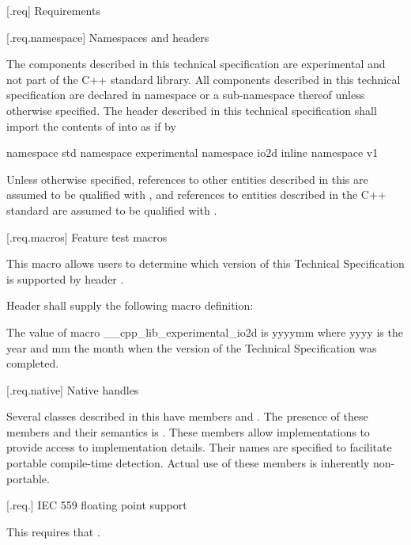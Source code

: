  [\iotwod.req] {Requirements}

 [\iotwod.req.namespace] {Namespaces and headers}

\pnum
The components described in this technical specification are experimental and not part of the C++ standard library. All components described in this technical specification are declared in namespace
 or a sub-namespace thereof unless otherwise specified. The header described in this technical specification shall import the contents of  into  as if by

\pnum
\begin{codeblock}
namespace std {
  namespace experimental {
    namespace io2d {
      inline namespace v1 { }
    }
  }
}
\end{codeblock}

\pnum
Unless otherwise specified, references to other entities described in this \documenttypename are assumed to be qualified with , and references to entities
described in the C++ standard are assumed to be qualified with .

 [\iotwod.req.macros] {Feature test macros}

\pnum
This macro allows users to determine which version of this Technical Specification is supported by header .

\pnum
Header  shall supply the following macro definition:

\pnum
{}

\pnum
\enternote
The value of macro __cpp_lib_experimental_io2d is yyyymm where yyyy is the year
and mm the month when the version of the Technical Specification was completed. \exitnote

 [\iotwod.req.native] {Native handles}

\pnum
Several classes described in this \documenttypename have members 
 and . The presence of these 
members and their semantics is .
\enternote
These members allow implementations to provide access to implementation 
details. Their names are specified to facilitate portable compile-time 
detection. Actual use of these members is inherently non-portable.
\exitnote

 [\iotwod.req.\iecfivefivenine] {IEC 559 floating point support}

\pnum
This \documenttypename requires that . 
